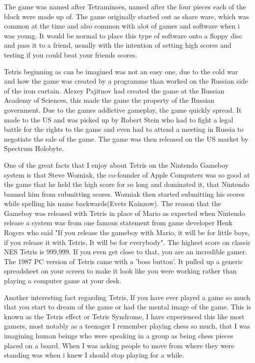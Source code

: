 \documentclass{article}
\begin{document}
The game was named after Tetraminoes, named after the four pieces each of the block were made up of. The game originally started out as share ware, which was common at the time and also common with alot of games and software when i was young. It would be normal to place this type of software onto a floppy disc and pass it to a friend, usually with the intention of setting high scores and testing if you could beat your friends scores. \newline

Tetris beginning as can be imagined was not an easy one, due to the cold war and how the game was created by a programme than worked on the Russian side of the iron curtain. Alexey Pajitnov had created the game at the Russian Academy of Sciences, this made the game the property of the Russian government. Due to the games addictive gameplay, the game quickly spread. It made to the US and was picked up by Robert Stein who had to fight a legal battle for the rights to the game and even had to attend a meeting in Russia to negotiate the sale of the game. The game was then released on the US market by Spectrum Holobyte. \newline

One of the great facts that I enjoy about Tetris on the Nintendo Gameboy system is that Steve Wozniak, the co-founder of Apple Computers was so good at the game that he held the high score for so long and dominated it, that Nintendo banned him from submitting scores. Wozniak then started submitting his scores while spelling his name backwards(Evets Kainzow). The reason that the Gameboy was released with Tetris in place of Mario as expected when Nintendo release a system was from one famous statement from game developer Henk Rogers who said "If you release the gameboy with Mario, it will be for little boys, if you release it with Tetris, It will be for everybody". The highest score on classic NES Tetris is 999,999. If you even get close to that, you are an incredible gamer. The 1987 PC version of Tetris came with a 'boss button'. It pulled up a generic spreadsheet on your screen to make it look like you were working rather than playing a computer game at your desk. \newline

Another interesting fact regarding Tetris, If you have ever played a game so much that you start to dream of the game or had the mental image of the game. This is known as the Tetris effect or Tetris Syndrome, I have experienced this like most gamers, most notably as a teenager I remember playing chess so much, that I was imagining human beings who were speaking in a group as being chess pieces placed on a board. When I was asking people to move from where they were standing was when i knew I should stop playing for a while. \newline
\end{document}
